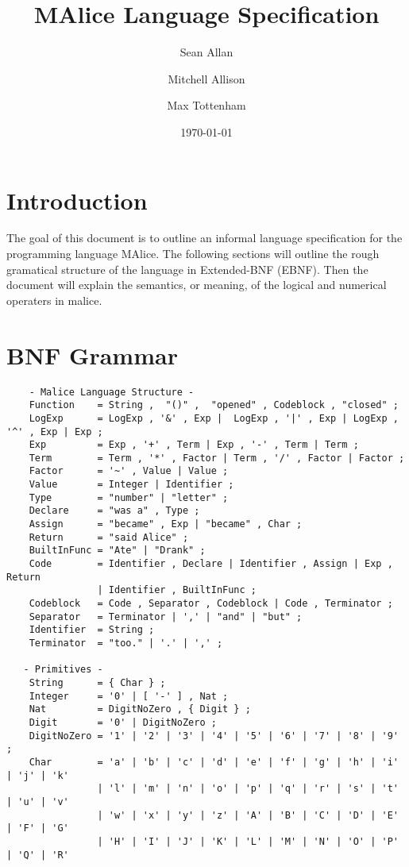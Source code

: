 \documentclass[a4wide, 10pt]{article}
\begin{document}
\title{MAlice Language Specification}

\author{Sean Allan \and Mitchell Allison \and Max Tottenham}

\date{\today}         %

\maketitle            %

\section{Introduction}
The goal of this document is to outline an informal language specification for 
the programming language MAlice. The following sections will outline the rough
gramatical structure of the language in Extended-BNF (EBNF). Then the 
document will explain the semantics, or meaning, of the logical and numerical 
operaters in malice.
\section{BNF Grammar} 
\begin{verbatim}
    - Malice Language Structure - 
    Function    = String ,  "()" ,  "opened" , Codeblock , "closed" ;
    LogExp      = LogExp , '&' , Exp |  LogExp , '|' , Exp | LogExp , '^' , Exp | Exp ;
    Exp         = Exp , '+' , Term | Exp , '-' , Term | Term ;
    Term        = Term , '*' , Factor | Term , '/' , Factor | Factor ;
    Factor      = '~' , Value | Value ;
    Value       = Integer | Identifier ;
    Type        = "number" | "letter" ;
    Declare     = "was a" , Type ;
    Assign      = "became" , Exp | "became" , Char ;
    Return      = "said Alice" ;
    BuiltInFunc = "Ate" | "Drank" ;
    Code        = Identifier , Declare | Identifier , Assign | Exp , Return  
                | Identifier , BuiltInFunc ;
    Codeblock   = Code , Separator , Codeblock | Code , Terminator ; 
    Separator   = Terminator | ',' | "and" | "but" ; 
    Identifier  = String ;
    Terminator  = "too." | '.' | ',' ;

   - Primitives -
    String      = { Char } ;
    Integer     = '0' | [ '-' ] , Nat ;
    Nat         = DigitNoZero , { Digit } ;
    Digit       = '0' | DigitNoZero ; 
    DigitNoZero = '1' | '2' | '3' | '4' | '5' | '6' | '7' | '8' | '9' ;
    Char        = 'a' | 'b' | 'c' | 'd' | 'e' | 'f' | 'g' | 'h' | 'i' | 'j' | 'k' 
                | 'l' | 'm' | 'n' | 'o' | 'p' | 'q' | 'r' | 's' | 't' | 'u' | 'v'
                | 'w' | 'x' | 'y' | 'z' | 'A' | 'B' | 'C' | 'D' | 'E' | 'F' | 'G'
                | 'H' | 'I' | 'J' | 'K' | 'L' | 'M' | 'N' | 'O' | 'P' | 'Q' | 'R'
\end{verbatim}
\end{document}
